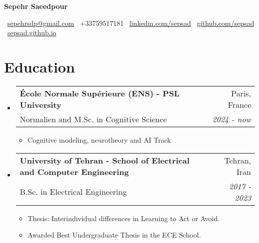 \documentclass[a4paper,10pt]{article}
\makeatletter
\newcommand{\resumeSubheading}[4]{
  \item
    \begin{tabular*}{0.98\textwidth}[t]{l@{\extracolsep{\fill}}r}
      \textbf{\color{subheadingColor}#1} & \textcolor{dateColor}{#2} \\
      #3 & \textit{#4} \\
    \end{tabular*}
}
\newcommand{\resumeSubHeadingListStart}{\begin{itemize}[leftmargin=*]}
\newcommand{\resumeSubHeadingListEnd}{\end{itemize}}
\newcommand{\contactInfo}[2]{\textcolor{sectionColor}{#1}~#2\hspace{1em}}
\makeatother
\begin{document}

\begin{center}
    {\Huge\textbf{\textcolor{sectionColor}{Sepehr Saeedpour}}}
    
    \vspace{0.1cm}
    
    \vspace{0.2cm}
    {\small
    \contactInfo{\faEnvelope}{{\href{mailto:sepehrsdp@gmail.com}{sepehrsdp@gmail.com}}}
    \contactInfo{\faPhone}{+33759517181}
    \contactInfo{\faLinkedin}{{\href{https://www.linkedin.com/in/sepsad}{linkedin.com/sepsad}}}
    \contactInfo{\faGithub}{{\href{https://github.com/sepsad}{github.com/sepsad}}}
    \contactInfo{\faGlobe}{{\href{https://sepsad.github.io}{sepsad.github.io}}}
    }
\end{center}

\section{Education}
  \resumeSubHeadingListStart

    \resumeSubheading
  {École Normale Supérieure (ENS) - PSL University}{Paris, France}
  {Normalien and M.Sc. in Cognitive Science}{2024 - now}
  \begin{itemize}
    \vspace{-3pt}
    \item Cognitive modeling, neurotheory and AI Track
  \end{itemize}

    \resumeSubheading
      {University of Tehran - School of Electrical and Computer Engineering}{Tehran, Iran}
      {B.Sc. in Electrical Engineering}{2017 - 2023}
      \begin{itemize}
      	\vspace{-3pt}
      	\item Thesis: Interindividual differences in Learning to Act or Avoid. 
        \item Awarded Best Undergraduate Thesis in the ECE School.
      \end{itemize}
  
  \resumeSubHeadingListEnd
\end{document}
